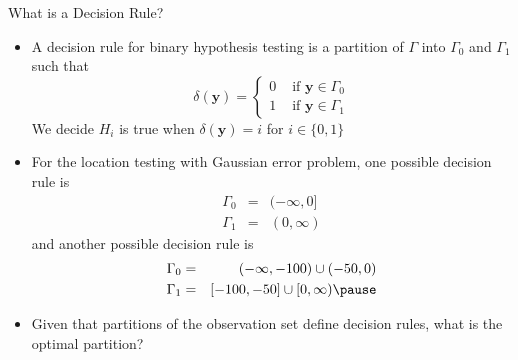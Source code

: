 \documentclass[t]{beamer}
\begin{document}
\begin{frame}{What is a Decision Rule?}
  \footnotesize
  \begin{itemize}
    \pause
    \item A decision rule for binary hypothesis testing is a partition of $\Gamma$ into $\Gamma_0$ and $\Gamma_1$ such that
    \begin{equation*}
      \delta(\mathbf{y}) = \left\{
      \begin{array}{ll}
          0 & \text{ if } \mathbf{y} \in \Gamma_0 \\
          1 & \text{ if } \mathbf{y} \in \Gamma_1 
      \end{array}
      \right.
    \end{equation*}
    We decide $H_i$ is true when $\delta(\mathbf{y}) = i$ for $i\in\{0,1\}$
    \pause
    \item For the location testing with Gaussian error problem, one possible decision rule is 
      \begin{eqnarray*}
        \Gamma_0 & = & (-\infty, 0] \\
        \Gamma_1 & = & (0,\infty) 
      \end{eqnarray*}
    \pause
    and another possible decision rule is
      \begin{eqnarray*}
        \Gamma_0 & = & (-\infty, -100) \cup (-50,0) \\
        \Gamma_1 & = & [-100, -50]\cup[0,\infty) 
        \pause
      \end{eqnarray*}
    \item Given that partitions of the observation set define decision rules, what is the optimal partition?
  \end{itemize}
  \normalsize
\end{frame}
\end{document}
